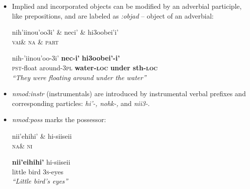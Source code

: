 \documentclass[portrait,a0paper,fontscale=0.36]{baposter} %
\begin{document}
\begin{poster}
{\begin{itemize}
\small
\begin{exe}
\ex \label{nmod:objim}%
\begin{dependency}
\begin{deptext}
neeyeih'oonotooneenou'u \& bei'ci3ei'i.\\
\textsc{vai.o}\& \textsc{ni}\\
\end{deptext}
\end{dependency}
\gll neeyeih-'oonotoonee-nou'u \textbf{bei'ci3ei'i}.\\
{\textsc{ic}.try-\textsc{redup}-borrow things-12.\textsc{iter}} money\\
\trans \textit{``Whenever we try to borrow money.''}
\end{exe}
\normalsize
\item Implied and incorporated objects can be modified by an adverbial participle, like prepositions, and are labeled as \textit{:objad} -- object of an adverbial:

\small
\begin{exe}
\ex \label{objad}
\begin{dependency}
\begin{deptext}
nih'iinou'oo3i' \& neci' \& hi3oobei'i'\\
\textsc{vai}\& \textsc{na} \& \textsc{part}\\
\end{deptext}
\end{dependency}
\gll nih-'iinou'oo-3i' \textbf{nec-i'} \textbf{hi3oobei'-i'}\\
{\textsc{pst}-float around-\textsc{3pl}} \textbf{water-\textsc{loc}} \textbf{{under sth-\textsc{loc}}}\\
\trans \textit{``They were floating around under the water''}
\end{exe}
\normalsize
\item \textit{nmod:instr} (instrumentals) are introduced by instrumental verbal prefixes and corresponding particles: \textit{hi'-, nohk-,} and \textit{nii3-}.
\item \textit{nmod:poss} marks the possessor:

\footnotesize
\begin{exe}
\ex \label{poss}
\begin{dependency}
\begin{deptext}
nii'ehihi' \& hi-siiseii\\
\textsc{na}\& \textsc{ni}\\
\end{deptext}
\end{dependency}
\gll \textbf{nii'eihihi'} {hi-siiseii}\\
{little bird} {3\textsc{s}-eyes}\\
\trans \textit{``Little bird's eyes''}
\end{exe}
\end{itemize}
}


\end{poster}
\end{document}
